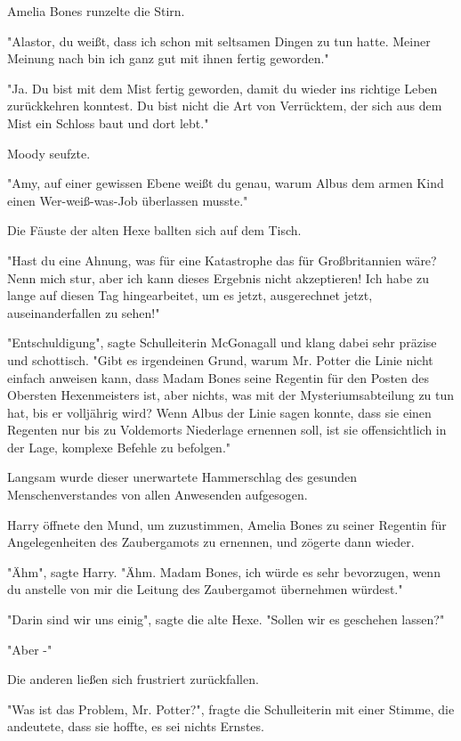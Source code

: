{Amelia Bones runzelte die Stirn.

"Alastor, du weißt, dass ich schon mit seltsamen Dingen zu tun hatte. Meiner Meinung nach bin ich ganz gut mit ihnen fertig geworden."

"Ja. Du bist mit dem Mist fertig geworden, damit du wieder ins richtige Leben zurückkehren konntest. Du bist nicht die Art von Verrücktem, der sich aus dem Mist ein Schloss baut und dort lebt."

Moody seufzte.

"Amy, auf einer gewissen Ebene weißt du genau, warum Albus dem armen Kind einen Wer-weiß-was-Job überlassen musste."

Die Fäuste der alten Hexe ballten sich auf dem Tisch.

"Hast du eine Ahnung, was für eine Katastrophe das für Großbritannien wäre? Nenn mich stur, aber ich kann dieses Ergebnis nicht akzeptieren! Ich habe zu lange auf diesen Tag hingearbeitet, um es jetzt, ausgerechnet jetzt, auseinanderfallen zu sehen!"

"Entschuldigung", sagte Schulleiterin McGonagall und klang dabei sehr präzise und schottisch. "Gibt es irgendeinen Grund, warum Mr. Potter die Linie nicht einfach anweisen kann, dass Madam Bones seine Regentin für den Posten des Obersten Hexenmeisters ist, aber nichts, was mit der Mysteriumsabteilung zu tun hat, bis er volljährig wird? Wenn Albus der Linie sagen konnte, dass sie einen Regenten nur bis zu Voldemorts Niederlage ernennen soll, ist sie offensichtlich in der Lage, komplexe Befehle zu befolgen."

Langsam wurde dieser unerwartete Hammerschlag des gesunden Menschenverstandes von allen Anwesenden aufgesogen.

Harry öffnete den Mund, um zuzustimmen, Amelia Bones zu seiner Regentin für Angelegenheiten des Zaubergamots zu ernennen, und zögerte dann wieder.

"Ähm", sagte Harry. "Ähm. Madam Bones, ich würde es sehr bevorzugen, wenn du anstelle von mir die Leitung des Zaubergamot übernehmen würdest."

"Darin sind wir uns einig", sagte die alte Hexe. "Sollen wir es geschehen lassen?"

"Aber -"

Die anderen ließen sich frustriert zurückfallen.

"Was ist das Problem, Mr. Potter?", fragte die Schulleiterin mit einer Stimme, die andeutete, dass sie hoffte, es sei nichts Ernstes.

}

